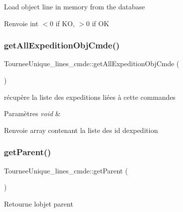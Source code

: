 Load object line in memory from the database

\begin{DoxyReturn}{Renvoie}
int $<$0 if KO, $>$0 if OK 
\end{DoxyReturn}
\mbox{\label{classTourneeUnique__lines__cmde_aa5eaac268620b600a7693b318a2a596c}} 
\subsubsection{\texorpdfstring{get\+All\+Expedition\+Obj\+Cmde()}{getAllExpeditionObjCmde()}}
{\footnotesize\ttfamily Tournee\+Unique\+\_\+lines\+\_\+cmde\+::get\+All\+Expedition\+Obj\+Cmde (\begin{DoxyParamCaption}{ }\end{DoxyParamCaption})}

récupère la liste des expeditions liées à cette commandes


\begin{DoxyParams}{Paramètres}
{\em void} & \\
\hline
\end{DoxyParams}
\begin{DoxyReturn}{Renvoie}
array contenant la liste des id d\textquotesingle{}expedition 
\end{DoxyReturn}
\mbox{\label{classTourneeUnique__lines__cmde_aa5efaa5cdbbeb74ea06a132be5af5832}} 
\subsubsection{\texorpdfstring{get\+Parent()}{getParent()}}
{\footnotesize\ttfamily Tournee\+Unique\+\_\+lines\+\_\+cmde\+::get\+Parent (\begin{DoxyParamCaption}{ }\end{DoxyParamCaption})}

Retourne l\textquotesingle{}objet parent


